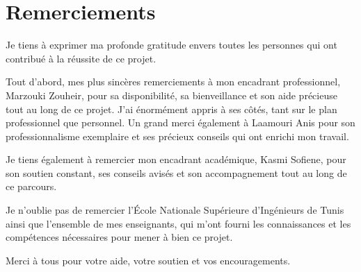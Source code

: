 \chapter*{Remerciements}
\thispagestyle{MyStyle}




Je tiens à exprimer ma profonde gratitude envers toutes les personnes qui ont contribué à la réussite de ce projet.\par

\vspace{0.3cm}

\noindent Tout d’abord, mes plus sincères remerciements à mon encadrant professionnel, Marzouki Zouheir, pour sa disponibilité, sa bienveillance et son aide précieuse tout au long de ce projet. J’ai énormément appris à ses côtés, tant sur le plan professionnel que personnel. Un grand merci également à Laamouri Anis pour son professionnalisme exemplaire et ses précieux conseils qui ont enrichi mon travail.\par


\vspace{0.3cm}

\noindent Je tiens également à remercier mon encadrant académique, Kasmi Sofiene, pour son soutien constant, ses conseils avisés et son accompagnement tout au long de ce parcours.\par

\vspace{0.3cm}

\noindent Je n’oublie pas de remercier l’École Nationale Supérieure d’Ingénieurs de Tunis ainsi que l’ensemble de mes enseignants, qui m’ont fourni les connaissances et les compétences nécessaires pour mener à bien ce projet.\par

\vspace{0.3cm}
\noindent Merci à tous pour votre aide, votre soutien et vos encouragements.\par
